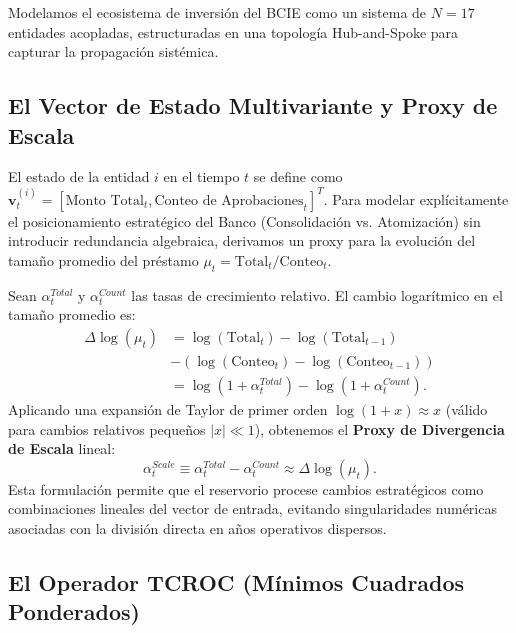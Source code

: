\documentclass[11pt, letterpaper]{report}
\newcommand{\vect}[1]{\mathbf{#1}}
\begin{document}
Modelamos el ecosistema de inversión del BCIE como un sistema de $N=17$ entidades acopladas, estructuradas en una topología Hub-and-Spoke para capturar la propagación sistémica.

\subsection{El Vector de Estado Multivariante y Proxy de Escala}

El estado de la entidad $i$ en el tiempo $t$ se define como $\vect{v}_t^{(i)} = [\text{Monto Total}_t, \text{Conteo de Aprobaciones}_t]^T$. Para modelar explícitamente el posicionamiento estratégico del Banco (Consolidación vs. Atomización) sin introducir redundancia algebraica, derivamos un proxy para la evolución del tamaño promedio del préstamo $\mu_t = \text{Total}_t / \text{Conteo}_t$.

Sean $\alpha_t^{Total}$ y $\alpha_t^{Count}$ las tasas de crecimiento relativo. El cambio logarítmico en el tamaño promedio es:
\begin{align}
    \Delta \log(\mu_t) &= \log(\text{Total}_t) - \log(\text{Total}_{t-1}) \nonumber \\
                       &- (\log(\text{Conteo}_t) - \log(\text{Conteo}_{t-1})) \nonumber \\
                       &= \log(1 + \alpha_t^{Total}) - \log(1 + \alpha_t^{Count}).
\end{align}
Aplicando una expansión de Taylor de primer orden $\log(1+x) \approx x$ (válido para cambios relativos pequeños $|x| \ll 1$), obtenemos el \textbf{Proxy de Divergencia de Escala} lineal:
\begin{equation}
    \alpha_t^{Scale} \equiv \alpha_t^{Total} - \alpha_t^{Count} \approx \Delta \log(\mu_t).
\end{equation}
Esta formulación permite que el reservorio procese cambios estratégicos como combinaciones lineales del vector de entrada, evitando singularidades numéricas asociadas con la división directa en años operativos dispersos.

\subsection{El Operador TCROC (Mínimos Cuadrados Ponderados)}
\end{document}
